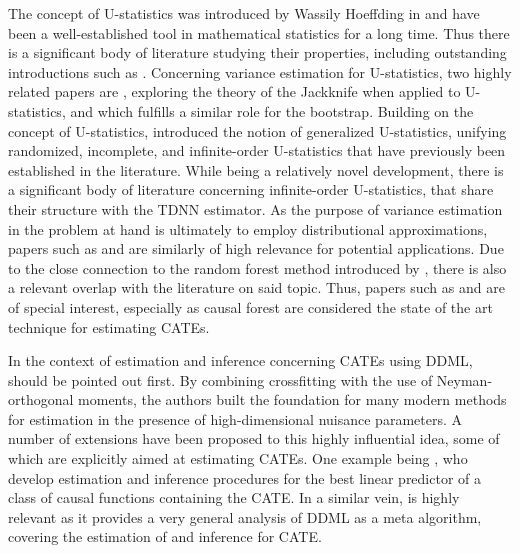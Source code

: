 The concept of U-statistics was introduced by Wassily Hoeffding in
\citet{hoeffding_class_1948} and have been a well-established tool in
mathematical statistics for a long time. Thus there is a significant body of
literature studying their properties, including outstanding introductions such
as \citet{lee_u-statistics_2019}. Concerning variance estimation for
U-statistics, two highly related papers are \citet{arvesen_jackknifing_1969},
exploring the theory of the Jackknife when applied to U-statistics, and
\citet{arcones_bootstrap_1992} which fulfills a similar role for the bootstrap.
Building on the concept of U-statistics, \citet{peng_rates_2022} introduced the
notion of generalized U-statistics, unifying randomized, incomplete, and
infinite-order U-statistics that have previously been established in the
literature. While being a relatively novel development, there is a significant
body of literature concerning infinite-order U-statistics, that share their
structure with the TDNN estimator. As the purpose of variance estimation in the
problem at hand is ultimately to employ distributional approximations, papers
such as \citet{chen_randomized_2019} and \citet{song_approximating_2019} are
similarly of high relevance for potential applications. Due to the close
connection to the random forest method introduced by
\citet{breiman_random_2001}, there is also a relevant overlap with the
literature on said topic. Thus, papers such as \citet{wager2014confidence} and
\citet{wager_estimation_2018} are of special interest, especially as causal forest are considered the state of the art technique for estimating CATEs.

In the context of estimation and inference concerning CATEs using DDML, \citet{chernozhukov_doubledebiased_2018} should be pointed out first.
By combining crossfitting with the use of Neyman-orthogonal moments, the authors built the foundation for many modern methods for estimation in the presence of high-dimensional nuisance parameters.
A number of extensions have been proposed to this highly influential idea, some of which are explicitly aimed at estimating CATEs.
One example being \citet{semenova_debiased_2021}, who develop estimation and inference procedures for the best linear predictor of a class of causal functions containing the CATE.
In a similar vein, \citet{chernozhukov_simple_2022} is highly relevant as it provides a very general analysis of DDML as a meta algorithm, covering the estimation of and inference for CATE.
